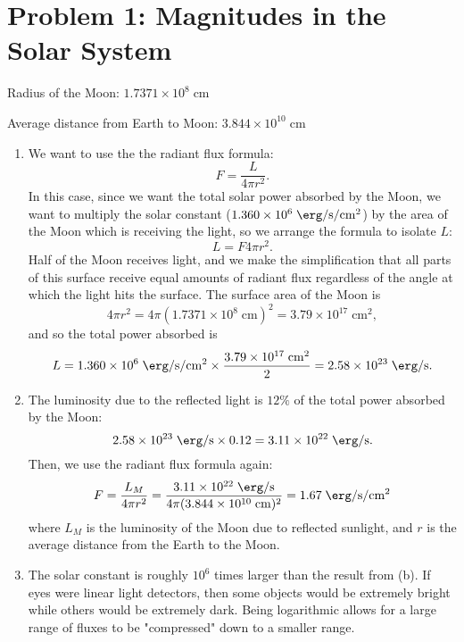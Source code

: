 \documentclass[11pt,letterpaper]{article}
\begin{document}
	
	\section*{Problem 1: Magnitudes in the Solar System}
	
	Radius of the Moon: $1.7371 \times 10^8\;\si{\cm}$
	
	Average distance from Earth to Moon: $3.844 \times 10^{10} \;\si{\cm}$
	
	\begin{enumerate}[label=(\alph*)]
		\item
		We want to use the the radiant flux formula: $$F=\frac{L}{4\pi r^2}.$$ In this case, since we want the total solar power absorbed by the Moon, we want to multiply the solar constant ($1.360 \times 10^6 \;\si{\erg\per\second\per\square\cm}$) by the area of the Moon which is receiving the light, so we arrange the formula to isolate $L$: $$L=F4\pi r^2.$$ Half of the Moon receives light, and we make the simplification that all parts of this surface receive equal amounts of radiant flux regardless of the angle at which the light hits the surface. The surface area of the Moon is $$4\pi r^2 = 4\pi (1.7371 \times 10^8\;\si{\cm})^2 = 3.79\times 10^{17} \;\si{\square\cm},$$ and so the total power absorbed is $$L=1.360\times 10^6 \;\si{\erg\per\second\per\square\cm} \times \frac{3.79\times 10^{17} \;\si{\square\cm}}{2} = 2.58 \times 10^{23} \;\si{\erg\per\second}.$$
		
		
		\item
		The luminosity due to the reflected light is $12\%$ of the total power absorbed by the Moon: $$2.58 \times 10^{23} \;\si{\erg\per\second} \times 0.12 = 3.11 \times 10^{22} \;\si{\erg\per\second}.$$ Then, we use the radiant flux formula again: $$F = \frac{L_M}{4\pi r^2} = \frac{3.11 \times 10^{22} \;\si{\erg\per\second}}{4\pi (3.844 \times 10^{10}\;\si{\cm})^2} = 1.67\;\si{\erg\per\second\per\square\cm}$$ where $L_M$ is the luminosity of the Moon due to reflected sunlight, and $r$ is the average distance from the Earth to the Moon.
		
		\item
		The solar constant is roughly $10^6$ times larger than the result from (b). If eyes were linear light detectors, then some objects would be extremely bright while others would be extremely dark. Being logarithmic allows for a large range of fluxes to be "compressed" down to a smaller range.
		

\end{enumerate}
\end{document}
